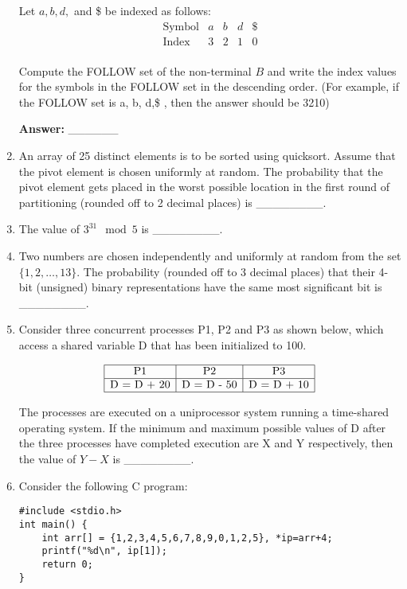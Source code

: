 \documentclass[12pt]{article}
\begin{document}
\begin{enumerate}[label=Q.\arabic*]
Let $a, b, d,$ and \$ be indexed as follows:
\[
\begin{array}{c|cccc}
\text{Symbol} & a & b & d & \$ \\
\hline
\text{Index} & 3 & 2 & 1 & 0 \\
\end{array}
\]

Compute the FOLLOW set of the non-terminal $B$ and write the index values for the symbols in the FOLLOW set in the descending order. (For example, if the FOLLOW set is a, b, d,\$ , then the answer should be 3210)

\textbf{Answer:} \_\_\_\_\_\_

\item An array of 25 distinct elements is to be sorted using quicksort. Assume that the pivot element is chosen uniformly at random. The probability that the pivot element gets placed in the worst possible location in the first round of partitioning (rounded off to 2 decimal places) is \_\_\_\_\_\_\_\_.

\item The value of $3^{31} \mod 5$ is \_\_\_\_\_\_\_\_.

\item Two numbers are chosen independently and uniformly at random from the set $\{1, 2, \ldots, 13\}$. The probability (rounded off to 3 decimal places) that their 4-bit (unsigned) binary representations have the same most significant bit is \_\_\_\_\_\_\_\_.

\item Consider three concurrent processes P1, P2 and P3 as shown below, which access a shared variable D that has been initialized to 100.

\[
\begin{array}{|c|c|c|}
\hline
\text{P1} & \text{P2} & \text{P3} \\
\hline
\text{D = D + 20} & \text{D = D - 50} & \text{D = D + 10} \\
\hline
\end{array}
\]

The processes are executed on a uniprocessor system running a time-shared operating system. If the minimum and maximum possible values of D after the three processes have completed execution are X and Y respectively, then the value of $Y - X$ is \_\_\_\_\_\_\_\_.

\item Consider the following C program:
\begin{verbatim}
#include <stdio.h>
int main() {
    int arr[] = {1,2,3,4,5,6,7,8,9,0,1,2,5}, *ip=arr+4;
    printf("%d\n", ip[1]);
    return 0;
}
\end{verbatim}


\end{enumerate}
\end{document}
